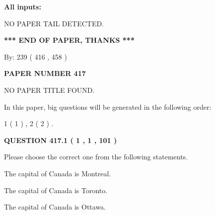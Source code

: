 \documentclass[12pt]{article}
\begin{document}
   
   
   
\noindent{}
   
   
   
   
\noindent\vspace{0.1in}\hspace{-0.08in} {\textbf{\Large{All inputs: }}}
   
   
   
   
\vspace{2.0in} NO PAPER TAIL DETECTED.
   
   
   
   
\vspace{1.0in} 
{\textbf{\large{ *** END OF PAPER, THANKS *** }}} 
   
   
\hspace{1.0in} By: 
 239 ( 416 ,  458 )
   
   
   
   
\newpage 
\setcounter{page}{ 
   417001 } 
   
   
   
   
 {\textbf{ \Large{ PAPER NUMBER  417  }}}
   
   
\vspace{0.2in}
   
   
   
   
   
   
 NO PAPER TITLE FOUND.
   
   
   
\vspace{0.2in}
   
In this paper, big questions will be generated in the following order: 
   
   
   1 ( 1 )
 ,
   2 ( 2 )
 .
  
\vspace{0.2in}
  
{\textbf{\Large{QUESTION
417.1 
 ( 1 , 1 , 101 )
}}}
  
  
Please choose the correct one from the following statements.
 
 
The capital of Canada is Montreal.
 
 
The capital of Canada is Toronto.
 
 
The capital of Canada is Ottawa.
 
\end{document}
